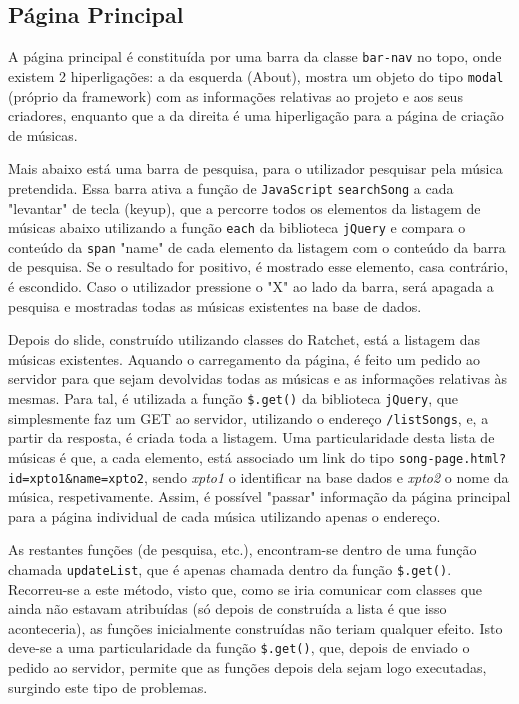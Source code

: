 \documentclass[a4paper,11pt,openright,oneside]{report}
\begin{document}
\subsection{Página Principal}
\label{sec.mobile.index}

A página principal é constituída por uma barra da classe \texttt{bar-nav} no topo, onde existem 2 hiperligações: a da esquerda (About), mostra um objeto do tipo \texttt{modal} (próprio da framework) com as informações relativas ao projeto e aos seus criadores, enquanto que a da direita é uma hiperligação para a página de criação de músicas.

Mais abaixo está uma barra de pesquisa, para o utilizador pesquisar pela música pretendida. Essa barra ativa a função de \verb|JavaScript| \texttt{searchSong} a cada "levantar" de tecla (keyup), que a percorre todos os elementos da listagem de músicas abaixo utilizando a função \texttt{each} da biblioteca \verb|jQuery| e compara o conteúdo da \texttt{span} "name" de cada elemento da listagem com o conteúdo da barra de pesquisa. Se o resultado for positivo, é mostrado esse elemento, casa contrário, é escondido. Caso o utilizador pressione o "X" ao lado da barra, será apagada a pesquisa e mostradas todas as músicas existentes na base de dados.

Depois do slide, construído utilizando classes do Ratchet, está a listagem das músicas existentes. Aquando o carregamento da página, é feito um pedido ao servidor para que sejam devolvidas todas as músicas e as informações relativas às mesmas. Para tal, é utilizada a função \texttt{\$.get()} da biblioteca \verb|jQuery|, que simplesmente faz um GET ao servidor, utilizando o endereço \texttt{/listSongs}, e, a partir da resposta, é criada toda a listagem. Uma particularidade desta lista de músicas é que, a cada elemento, está associado um link do tipo \texttt{song-page.html?id=xpto1\&name=xpto2}, sendo \textit{xpto1} o identificar na base dados e \textit{xpto2} o nome da música, respetivamente. Assim, é possível "passar" informação da página principal para a página individual de cada música utilizando apenas o endereço.

As restantes funções (de pesquisa, etc.), encontram-se dentro de uma função chamada \texttt{updateList}, que é apenas chamada dentro da função \texttt{\$.get()}. Recorreu-se a este método, visto que, como se iria comunicar com classes que ainda não estavam atribuídas (só depois de construída a lista é que isso aconteceria), as funções inicialmente construídas não teriam qualquer efeito. Isto deve-se a uma particularidade da função \texttt{\$.get()}, que, depois de enviado o pedido ao servidor, permite que as funções depois dela sejam logo executadas, surgindo este tipo de problemas.
\end{document}

